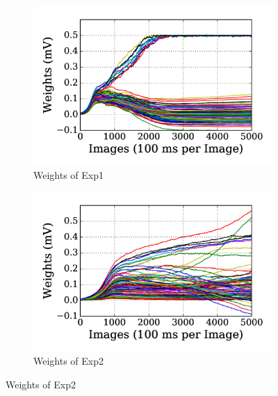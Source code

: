 \begin{figure}
	\centering
	\DIFdelbeginFL %
\DIFdelendFL \DIFaddbeginFL \begin{subfigure}[t]{0.48\textwidth}
		\DIFaddendFL \includegraphics[width=\textwidth]{pics_sdlm/10_exp_SRBM_Orig/exp1_weights_s.png}
		\caption{Weights of Exp1}
	\end{subfigure}
	\DIFdelbeginFL %
\DIFdelendFL \DIFaddbeginFL \begin{subfigure}[t]{0.48\textwidth}
		\DIFaddendFL \includegraphics[width=\textwidth]{pics_sdlm/10_exp_SRBM_Orig/exp2_weights_s.png}
		\caption{Weights of Exp2}
	\end{subfigure}
	\DIFdelbeginFL %

\end{figure}
